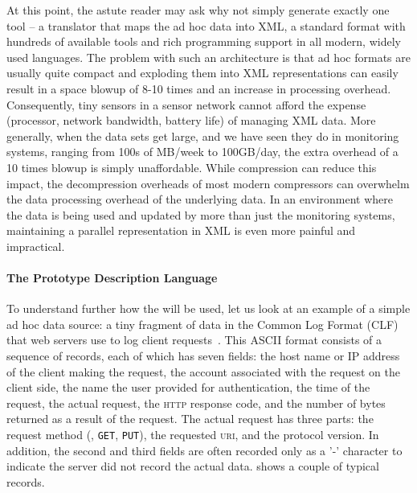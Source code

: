 \documentclass[10pt]{article}
\begin{document}
At this point, the astute reader may ask why not simply generate
exactly one tool -- a translator that maps the ad hoc data into
XML, a standard format with hundreds of available tools and
rich programming support in all modern, widely used languages.
The problem with such an architecture is that ad hoc formats
are usually quite compact and exploding them into XML representations
can easily result in a space blowup of 8-10 times and an increase
in processing overhead.  Consequently, tiny
sensors in a sensor network cannot afford the expense (processor,
network bandwidth, battery life) of managing
XML data.  More generally, when the data sets get large, and we 
have seen they do in monitoring systems, 
ranging from 100s of MB/week to 100GB/day,
the extra overhead of a 10 times blowup is simply unaffordable.
While compression can reduce this impact, the decompression overheads
of most modern compressors can overwhelm the data processing overhead
of the underlying data.
In an environment where the data is being used and updated
by more than just the monitoring systems, maintaining a parallel
representation in XML is even more painful and impractical.

\paragraph*{The Prototype Description Language}
To understand further how the \pads{} will be used,
let us look at an example of a simple ad hoc data source:
a tiny fragment of data in the Common Log Format (CLF) that web
servers use to log client requests~\cite{wpp}.  
This ASCII format consists of a sequence of
records, each of which has seven fields: the host name or IP address
of the client making the request, the account associated with the
request on the client side, the name the user provided for
authentication, the time of the request, the actual request, the
\textsc{http} response code, and the number of bytes returned as a
result of the request.  The actual request has three parts: the
request method (\eg, \texttt{GET}, \texttt{PUT}), the requested
\textsc{uri}, and the protocol version.  In addition, the second and
third fields are often recorded only as a '-' character to indicate
the server did not record the actual data.  
shows a couple of typical records.
\end{document}

